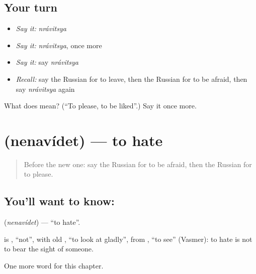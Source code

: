 \subsection*{Your turn}
\begin{itemize}
\raggedright
  \item \emph{Say it:} \emph{nrávitsya}
  \item \emph{Say it:} \emph{nrávitsya}, once more
  \item \emph{Say it:} say \emph{nrávitsya}
  \item \emph{Recall:} say the Russian for to leave, then the Russian for to be afraid, then say \emph{nrávitsya} again
\end{itemize}

\begin{tcolorbox}[breakable,colback=teal!4,colframe=teal!35!black,title={Before you move on}]
What does  mean? (\textquotedblleft{}To please, to be liked\textquotedblright{}.) Say it once more.
\end{tcolorbox}
\section[\texorpdfstring{\ru{ненавидеть} (nenavídet)}{ненавидеть (nenavídet)}]{ (nenavídet) — to hate}

\label{lesson:RU-C144-nenavidet}



\begin{quote}
Before the new one: say the Russian for to be afraid, then the Russian for to please.
\end{quote}

\subsection*{You'll want to know: }
\textbf{} (\emph{nenavídet}) — \textquotedblleft{}to hate\textquotedblright{}.

\begin{cousinweb}
\textbf{} is \emph{}, \textquotedblleft{}not\textquotedblright{}, with old \emph{}, \textquotedblleft{}to look at gladly\textquotedblright{}, from \emph{}, \textquotedblleft{}to see\textquotedblright{} (Vasmer): to hate is not to bear the sight of someone.
\end{cousinweb}

\begin{grammarlens}[title={What you've built}]
One more word for this chapter.
\end{grammarlens}

